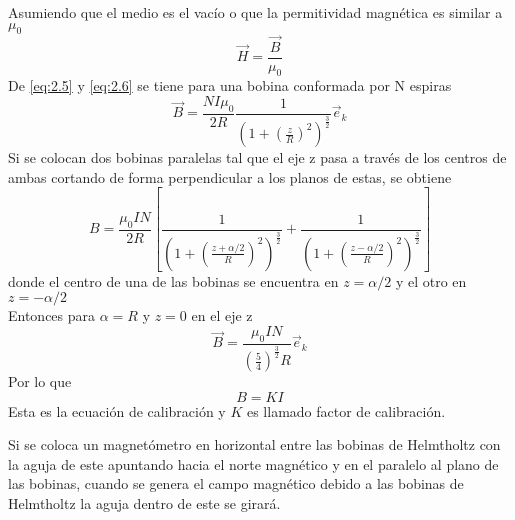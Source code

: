 \documentclass{article}
\begin{document}
Asumiendo que el medio es el vacío o que la permitividad magnética es similar a $\mu _0$
\begin{equation}
	\vec{H}=\frac{\vec{B}}{\mu _0}
	\label{eq:2.6}
\end{equation}
De \eqref{eq:2.5} y \eqref{eq:2.6} se tiene para una bobina conformada por N espiras
\begin{equation}
	\vec{B}=\frac{NI \mu _0}{2R}\frac{1}{\left(1+\left(\frac{z }{R}\right)^2\right)^\frac{3}{2}}\vec{e}_k
\end{equation}
Si se colocan dos bobinas paralelas tal que el eje z pasa a través de los centros de ambas cortando de forma perpendicular a los planos de estas, se obtiene
\begin{equation}
	B = \frac{\mu _0IN}{2R}\left[\frac{1}{\left(1+\left(\frac{z+\alpha /2}{R}\right)^2\right)^\frac{3}{2}}+\frac{1}{\left(1+\left(\frac{z-\alpha /2}{R}\right)^2\right)^\frac{3}{2}}\right]
\end{equation}
donde el centro de una de las bobinas se encuentra en $z=\alpha /2$ y el otro en $z=-\alpha /2$\\
Entonces para $\alpha=R$ y $z=0$ en el eje z
\begin{equation}
	\vec{B}=\frac{\mu _0IN}{(\frac{5}{4})^\frac{3}{2}R}\vec{e}_k
\end{equation}
Por lo que
\begin{equation}
	B = KI
\end{equation}
Esta es la ecuación de calibración y $K$ es llamado factor de calibración.

Si se coloca un magnetómetro en horizontal entre las bobinas de Helmtholtz con la aguja de este apuntando hacia el norte magnético y en el paralelo al plano de las bobinas, cuando se genera el campo magnético debido a las bobinas de Helmtholtz la aguja dentro de este se girará.
\end{document}
